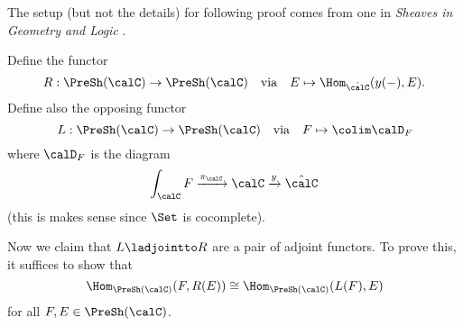 \documentclass[12pt]{article}
\begin{document}
\begin{prf}
	The setup (but not the details) for following proof comes from one in \textit{Sheaves in Geometry and Logic} \cite[41-43]{maclane-moerdijk}. 
	
	Define the functor
	\[R:\PreSh(\calC)\to \PreSh(\calC)\quad\text{via}\quad E\mapsto \Hom_{\hat\calC}(y(-),E).\]
	Define also the opposing functor 
	\[L:\PreSh(\calC)\to \PreSh(\calC)\quad\text{via}\quad F\mapsto \colim \calD_F\]
	where $\calD_F$ is the diagram  
	\[\int_\calC F\xrightarrow{\pi_\calC}\calC\xrightarrow{y}\hat\calC\]
	(this is makes sense since $\Set$ is cocomplete).

	Now we claim that $L\ladjointto R$ are a pair of adjoint functors. To prove this, it suffices to show that
	\[\Hom_{\PreSh(\calC)}(F,R(E))\cong \Hom_{\PreSh(\calC)}(L(F),E)\]
	for all $F,E\in\PreSh(\calC)$.


\end{prf}
\end{document}
